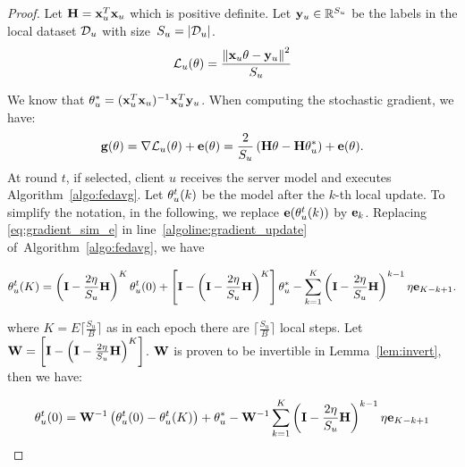 \begin{proof}
Let $\mathbf{H} = {\mathbf{x}}_u^T{\mathbf{x}}_u$ which is positive definite.
Let $\mathbf{y}_u\in \mathbb{R}^{S_u}$ be the labels in the local dataset $\mathcal{D}_u$ with size~$S_u=|\mathcal{D}_u|$. 
\begin{equation}\label{eq:localloss_linear_regression}
    {\ensuremath{\mathcal{L}}_u}(\theta) = \frac{\left\lVert {\mathbf{x}}_u \theta -\mathbf{y}_u\right\rVert^2}{S_u}
\end{equation}

We know that $\theta_u^* = ({\mathbf{x}}_u^T{\mathbf{x}}_u)^{-1} {\mathbf{x}}_u^T\mathbf{y}_u$. When computing the stochastic gradient, we have:
\begin{equation}\label{eq:gradient_sim_e}
    \mathbf{g}(\theta) =  \nabla {\ensuremath{\mathcal{L}}_u}(\theta)+ \mathbf{e}(\theta) = \frac{2}{S_u}\left( \mathbf{H} \theta - \mathbf{H}\theta_u^* \right) + \mathbf{e}(\theta).
\end{equation}
At round $t$, if selected, client $u$ receives the server model and executes Algorithm~\ref{algo:fedavg}. Let $\theta^t_u(k)$ be the model after the $k$-{th} local update. To simplify the notation, in the following, we replace $\mathbf{e}(\theta^t_u(k))$ by $\mathbf{e}_k$.
Replacing \eqref{eq:gradient_sim_e} in line~\ref{algoline:gradient_update} of~Algorithm~\ref{algo:fedavg}, we have

\begin{equation*}
    \model_u^t(K) =  \left(\i -  \frac{2\eta}{S_u}\H\right)^{K} \model_u^t(0) +  \left[ \i -  \left(\i -  \frac{2\eta}{S_u}\H\right)^{K} \right]\localmodel 
      - \sum_{k=1}^{K}\left(\i -  \frac{2\eta}{S_u}\H\right)^{k-1}\eta\e_{K-k+1}.%
\end{equation*}

where $K=E\lceil \frac{S_u}{B}\rceil$ as in each epoch there are $\lceil \frac{S_u}{B}\rceil$ local steps.
Let $\mathbf{W} = \left[ \mathbf{I} -  \left(\mathbf{I} -  \frac{2\eta}{S_u}\mathbf{H}\right)^{K} \right]$. $\mathbf{W}$ is proven to be invertible in Lemma~\ref{lem:invert}, then we have:

\begin{equation}
   \theta_u^t(0) =\mathbf{W}^{-1}\left(  \theta_u^t(0)-\theta_u^t(K)\right) + \theta_u^* 
   - \mathbf{W}^{-1}  \sum_{k=1}^{K}\left(\mathbf{I} -  \frac{2\eta}{S_u}\mathbf{H}\right)^{k-1}\eta\mathbf{e}_{K-k+1} \label{eq:ols}
\end{equation}


\end{proof}
